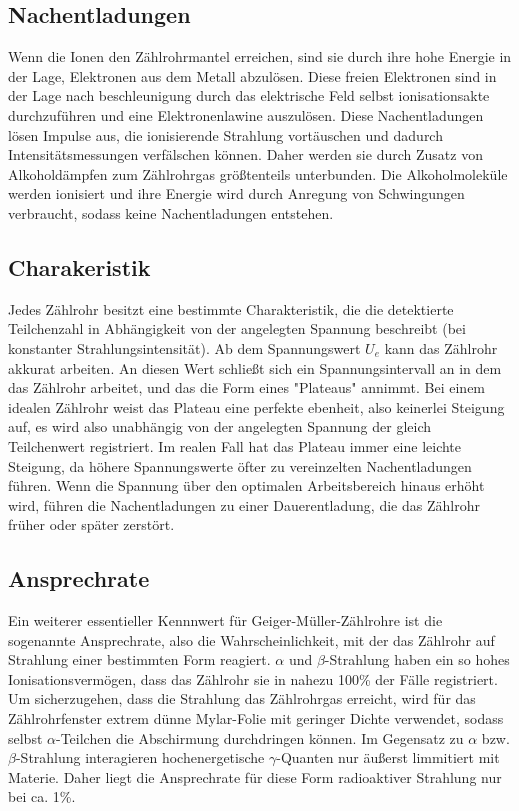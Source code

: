 \subsection{Nachentladungen}
Wenn die Ionen den Zählrohrmantel erreichen, sind sie durch ihre hohe Energie in der Lage, Elektronen aus dem Metall abzulösen. Diese freien Elektronen sind in der Lage nach beschleunigung durch das elektrische Feld selbst ionisationsakte durchzuführen und eine Elektronenlawine auszulösen. Diese Nachentladungen lösen Impulse aus, die ionisierende Strahlung vortäuschen und dadurch Intensitätsmessungen verfälschen können. Daher werden sie durch Zusatz von Alkoholdämpfen zum Zählrohrgas größtenteils unterbunden. Die Alkoholmoleküle werden ionisiert und ihre Energie wird durch Anregung von Schwingungen verbraucht, sodass keine Nachentladungen entstehen.
\subsection{Charakeristik}
Jedes Zählrohr besitzt eine bestimmte Charakteristik, die die detektierte Teilchenzahl in Abhängigkeit von der angelegten Spannung beschreibt (bei konstanter Strahlungsintensität). Ab dem Spannungswert $U_e$ kann das Zählrohr akkurat arbeiten. An diesen Wert schließt sich ein Spannungsintervall an in dem das Zählrohr arbeitet, und das die Form eines "Plateaus"  annimmt. Bei einem idealen Zählrohr weist das Plateau eine perfekte ebenheit, also keinerlei Steigung auf, es wird also unabhängig von der angelegten Spannung der gleich Teilchenwert registriert. Im realen Fall hat das Plateau immer eine leichte Steigung, da höhere Spannungswerte öfter zu vereinzelten Nachentladungen führen. Wenn die Spannung über den optimalen Arbeitsbereich hinaus erhöht wird, führen die Nachentladungen zu einer Dauerentladung, die das Zählrohr früher oder später zerstört.
\subsection{Ansprechrate}
Ein weiterer essentieller Kennnwert für Geiger-Müller-Zählrohre ist die sogenannte Ansprechrate, also die Wahrscheinlichkeit, mit der das Zählrohr auf Strahlung einer bestimmten Form reagiert. $\alpha$ und $\beta$-Strahlung haben ein so hohes Ionisationsvermögen, dass das Zählrohr sie in nahezu 100\% der Fälle registriert. Um sicherzugehen, dass die Strahlung das Zählrohrgas erreicht, wird für das Zählrohrfenster extrem dünne Mylar-Folie mit geringer Dichte verwendet, sodass selbst $\alpha$-Teilchen die Abschirmung durchdringen können. Im Gegensatz zu $\alpha$ bzw. $\beta$-Strahlung interagieren hochenergetische $\gamma$-Quanten nur äußerst limmitiert mit Materie. Daher liegt die Ansprechrate für diese Form radioaktiver Strahlung nur bei ca. 1\%.
